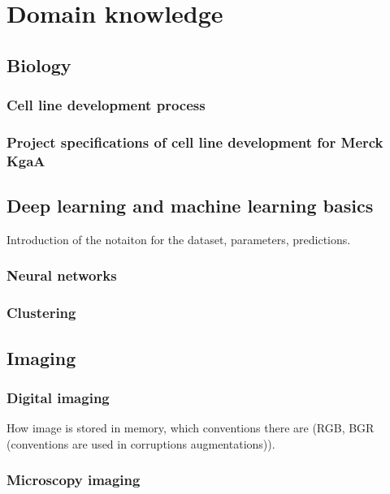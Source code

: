 \section{Domain knowledge}
    \subsection{Biology}
        \subsubsection{Cell line development process}
        
        \subsubsection{Project specifications of cell line development for Merck KgaA}
        
    \subsection{Deep learning and machine learning basics}
        Introduction of the notaiton for the dataset, parameters, predictions.
        \subsubsection{Neural networks}
            
        \subsubsection{Clustering}
            
    \subsection{Imaging}
        \subsubsection{Digital imaging}
            How image is stored in memory, which conventions there are (RGB, BGR (conventions are used in corruptions augmentations)).
        \subsubsection{Microscopy imaging}
            